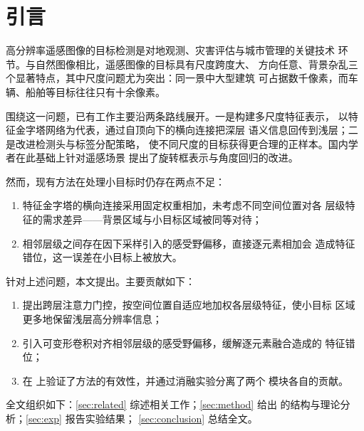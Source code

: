 \section{引言}
\label{sec:intro}

高分辨率遥感图像的目标检测是对地观测、灾害评估与城市管理的关键技术
环节\cite{cheng2016survey}。与自然图像相比，遥感图像的目标具有尺度跨度大、
方向任意、背景杂乱三个显著特点，其中尺度问题尤为突出：同一景中大型建筑
可占据数千像素，而车辆、船舶等目标往往只有十余像素。

围绕这一问题，已有工作主要沿两条路线展开。一是构建多尺度特征表示，
以特征金字塔网络\cite{lin2017fpn}为代表，通过自顶向下的横向连接把深层
语义信息回传到浅层；二是改进检测头与标签分配策略\cite{zhang2020atss}，
使不同尺度的目标获得更合理的正样本。国内学者在此基础上针对遥感场景
提出了旋转框表示与角度回归的改进\cite{wang2021remote}。

然而，现有方法在处理小目标时仍存在两点不足：

\begin{enumerate}
  \item 特征金字塔的横向连接采用固定权重相加，未考虑不同空间位置对各
        层级特征的需求差异——背景区域与小目标区域被同等对待；
  \item 相邻层级之间存在因下采样引入的感受野偏移，直接逐元素相加会
        造成特征错位，这一误差在小目标上被放大。
\end{enumerate}

针对上述问题，本文提出\ourmethod{}。主要贡献如下：

\begin{enumerate}
  \item 提出跨层注意力门控，按空间位置自适应地加权各层级特征，使小目标
        区域更多地保留浅层高分辨率信息；
  \item 引入可变形卷积对齐相邻层级的感受野偏移，缓解逐元素融合造成的
        特征错位；
  \item 在 \dataset{} 上验证了方法的有效性，并通过消融实验分离了两个
        模块各自的贡献。
\end{enumerate}

全文组织如下：\cref{sec:related} 综述相关工作；\cref{sec:method} 给出
\ourmethod{} 的结构与理论分析；\cref{sec:exp} 报告实验结果；
\cref{sec:conclusion} 总结全文。
